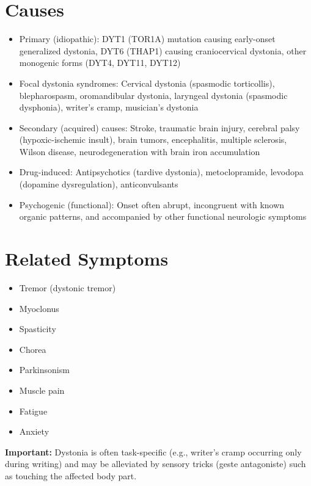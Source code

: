 \section*{Causes}
\begin{itemize}
  \item Primary (idiopathic): DYT1 (TOR1A) mutation causing early-onset generalized dystonia, DYT6 (THAP1) causing craniocervical dystonia, other monogenic forms (DYT4, DYT11, DYT12)
  \item Focal dystonia syndromes: Cervical dystonia (spasmodic torticollis), blepharospasm, oromandibular dystonia, laryngeal dystonia (spasmodic dysphonia), writer's cramp, musician's dystonia
  \item Secondary (acquired) causes: Stroke, traumatic brain injury, cerebral palsy (hypoxic-ischemic insult), brain tumors, encephalitis, multiple sclerosis, Wilson disease, neurodegeneration with brain iron accumulation
  \item Drug-induced: Antipsychotics (tardive dystonia), metoclopramide, levodopa (dopamine dysregulation), anticonvulsants
  \item Psychogenic (functional): Onset often abrupt, incongruent with known organic patterns, and accompanied by other functional neurologic symptoms
\end{itemize}

\section*{Related Symptoms}
\begin{itemize}
  \item Tremor (dystonic tremor)
  \item Myoclonus
  \item Spasticity
  \item Chorea
  \item Parkinsonism
  \item Muscle pain
  \item Fatigue
  \item Anxiety
\end{itemize}
\textbf{Important:} Dystonia is often task-specific (e.g., writer's cramp occurring only during writing) and may be alleviated by sensory tricks (geste antagoniste) such as touching the affected body part.

